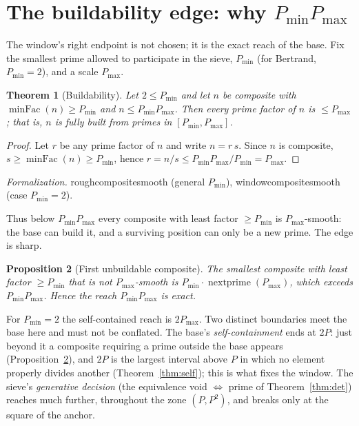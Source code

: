\documentclass[11pt,a4paper]{amsart}
\theoremstyle{plain}
\newtheorem{theorem}{Theorem}[section]
\newtheorem{proposition}[theorem]{Proposition}
\theoremstyle{definition}
\theoremstyle{plain}
\theoremstyle{remark}
\newcommand{\lean}[1]{\begingroup\upshape\ttfamily\def\_{\textunderscore\allowbreak}#1\endgroup}
\newcommand{\Formal}[1]{\par\smallskip\noindent\begingroup\raggedright\emph{Formalization.} #1\par\endgroup\smallskip}
\begin{document}
\section{The buildability edge: why $P_{\min}P_{\max}$}
\label{sec:edge}

The window's right endpoint is not chosen; it is the exact reach of the base. Fix the
smallest prime allowed to participate in the sieve, $P_{\min}$ (for Bertrand,
$P_{\min}=2$), and a scale $P_{\max}$.

\begin{theorem}[Buildability]\label{thm:build}
Let $2\le P_{\min}$ and let $n$ be composite with $\operatorname{minFac}(n)\ge P_{\min}$
and $n\le P_{\min}P_{\max}$. Then every prime factor of $n$ is $\le P_{\max}$; that is, $n$
is fully built from primes in $[P_{\min},P_{\max}]$.
\end{theorem}

\begin{proof}
Let $r$ be any prime factor of $n$ and write $n=r\,s$. Since $n$ is composite,
$s\ge\operatorname{minFac}(n)\ge P_{\min}$, hence
$r=n/s\le P_{\min}P_{\max}/P_{\min}=P_{\max}$.
\end{proof}

\Formal{\lean{rough\_composite\_smooth} (general $P_{\min}$),
\lean{window\_composite\_smooth} (case $P_{\min}=2$).}

Thus below $P_{\min}P_{\max}$ every composite with least factor $\ge P_{\min}$ is
$P_{\max}$-smooth: the base can build it, and a surviving position can only be a new
prime. The edge is sharp.

\begin{proposition}[First unbuildable composite]\label{prop:first}
The smallest composite with least factor $\ge P_{\min}$ that is \emph{not}
$P_{\max}$-smooth is $P_{\min}\cdot\operatorname{nextprime}(P_{\max})$, which exceeds
$P_{\min}P_{\max}$. Hence the reach $P_{\min}P_{\max}$ is exact.
\end{proposition}

For $P_{\min}=2$ the self-contained reach is $2P_{\max}$. Two distinct boundaries meet the base
here and must not be conflated. The base's \emph{self-containment} ends at $2P$: just beyond it
a composite requiring a prime outside the base appears (Proposition~\ref{prop:first}), and $2P$
is the largest interval above $P$ in which no element properly divides another
(Theorem~\ref{thm:self}); this is what fixes the window. The sieve's \emph{generative decision}
(the equivalence void $\Leftrightarrow$ prime of Theorem~\ref{thm:det}) reaches much
further, throughout the zone $(P,P^2)$, and breaks only at the square of the anchor.
\end{document}
